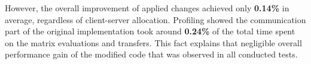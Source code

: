 However, the overall improvement of applied changes achieved only \textbf{0.14\%} in average, regardless of client-server allocation. Profiling showed the communication part of the original implementation took around \textbf{0.24\%} of the total time spent on the matrix evaluations and transfers. This fact explains that negligible overall performance gain of the modified code that was observed in all conducted tests.\\
